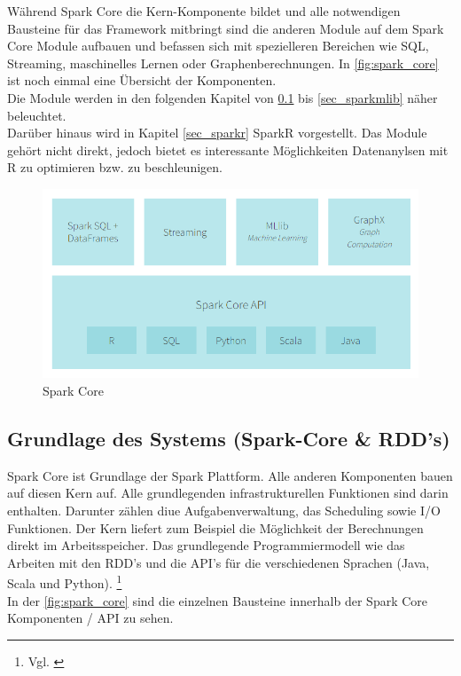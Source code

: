 \noindent
Während Spark Core die Kern-Komponente bildet und alle notwendigen Bausteine für das Framework mitbringt sind die anderen Module auf dem Spark Core Module aufbauen und befassen sich mit spezielleren Bereichen wie SQL, Streaming, maschinelles Lernen oder Graphenberechnungen. In \autoref{fig:spark_core} ist noch einmal eine Übersicht der Komponenten. \\
\noindent
Die Module werden in den folgenden Kapitel von \ref{sec_sparkcore} bis \ref{sec_sparkmlib} näher beleuchtet. \\

\noindent
Dar\"uber hinaus wird in Kapitel \ref{sec_sparkr} SparkR vorgestellt. Das Module gehört nicht direkt, jedoch bietet es interessante Möglichkeiten Datenanylsen mit R zu optimieren bzw. zu beschleunigen.


\begin{figure}[h]
  \centering
  \includegraphics[width=\textwidth]{./bilder/spark_core.png}
  \caption{Spark Core}\label{fig:spark_core}
\end{figure}









\newpage
\subsection{Grundlage des Systems (Spark-Core \& RDD’s)}\label{sec_sparkcore}
Spark Core ist Grundlage der Spark Plattform. Alle anderen Komponenten bauen auf diesen Kern auf. Alle grundlegenden infrastrukturellen Funktionen sind darin enthalten. Darunter zählen diue Aufgabenverwaltung, das Scheduling sowie I/O Funktionen.
Der Kern liefert zum Beispiel die Möglichkeit der Berechnungen direkt im Arbeitsspeicher. 
Das grundlegende Programmiermodell wie das Arbeiten mit den RDD's und die API's für die verschiedenen Sprachen (Java, Scala und Python).  \footnote{Vgl. \cite{DATABRICK_ABOUT}} \\
In der \autoref{fig:spark_core} sind die einzelnen Bausteine innerhalb der Spark Core Komponenten / API zu sehen. 
 



